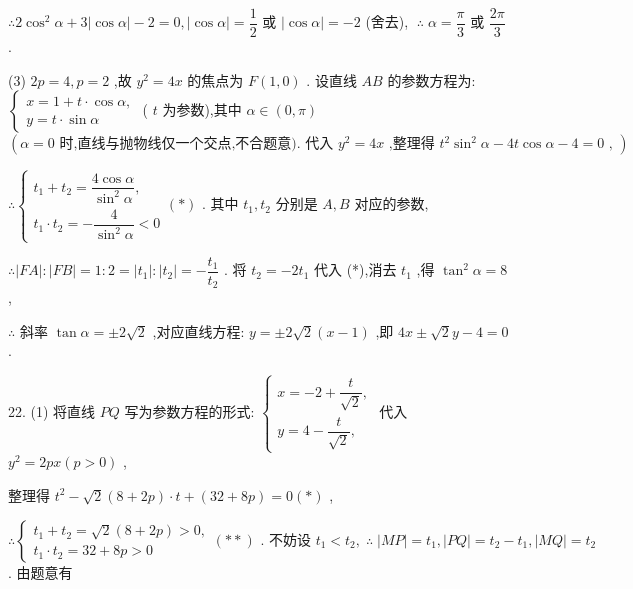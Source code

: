 $\therefore 2{\cos }^{2}\alpha  + 3\left| {\cos \alpha }\right|  - 2 = 0,\left| {\cos \alpha }\right|  = \dfrac{1}{2}$ 或 $\left| {\cos \alpha }\right|  =  - 2$ (舍去), $\;\therefore \;\alpha  = \dfrac{\pi }{3}$ 或 $\dfrac{2\pi }{3}$ .

(3) ${2p} = 4,p = 2$ ,故 ${y}^{2} = {4x}$ 的焦点为 $F\left( {1,0}\right)$ . 设直线 ${AB}$ 的参数方程为: $\left\{  \begin{array}{l} x = 1 + t \cdot  \cos \alpha , \\  y = t \cdot  \sin \alpha  \end{array}\right.$ ( $t$ 为参数),其中 $\alpha  \in  \left( {0,\pi }\right)$  $\left( {\alpha  = 0\text{ 时,直线与抛物线仅一个交点,不合题意). 代入 }{y}^{2} = {4x}\text{ ,整理得 }{t}^{2}{\sin }^{2}\alpha  - {4t}\cos \alpha  - 4 = 0\text{ , }}\right)$

$\therefore \left\{  {\begin{array}{l} {t}_{1} + {t}_{2} = \dfrac{4\cos \alpha }{{\sin }^{2}\alpha }, \\  {t}_{1} \cdot  {t}_{2} =  - \dfrac{4}{{\sin }^{2}\alpha } < 0 \end{array}\left( *\right) }\right.$ . 其中 ${t}_{1},{t}_{2}$ 分别是 $A,B$ 对应的参数,

$\therefore \left| {FA}\right|  : \left| {FB}\right|  = 1 : 2 = \left| {t}_{1}\right|  : \left| {t}_{2}\right|  =  - \dfrac{{t}_{1}}{{t}_{2}}$ . 将 ${t}_{2} =  - 2{t}_{1}$ 代入 (*),消去 ${t}_{1}$ ,得 ${\tan }^{2}\alpha  = 8$ ,

$\therefore$ 斜率 $\tan \alpha  =  \pm  2\sqrt{2}$ ,对应直线方程: $y =  \pm  2\sqrt{2}\left( {x - 1}\right)$ ,即 ${4x} \pm  \sqrt{2}y - 4 = 0$ .

22. (1) 将直线 ${PQ}$ 写为参数方程的形式: $\left\{  \begin{array}{l} x =  - 2 + \dfrac{t}{\sqrt{2}}, \\  y = 4 - \dfrac{t}{\sqrt{2}}, \end{array}\right.$ 代入 ${y}^{2} = {2px}\left( {p > 0}\right)$ ,

整理得 ${t}^{2} - \sqrt{2}\left( {8 + {2p}}\right)  \cdot  t + \left( {{32} + {8p}}\right)  = 0\left( *\right)$ ,

$\therefore \left\{  {\begin{array}{l} {t}_{1} + {t}_{2} = \sqrt{2}\left( {8 + {2p}}\right)  > 0, \\  {t}_{1} \cdot  {t}_{2} = {32} + {8p} > 0 \end{array}\left( {* * }\right) \text{ . 不妨设 }{t}_{1} < {t}_{2},\;\therefore \;\left| {MP}\right|  = {t}_{1},\left| {PQ}\right|  = {t}_{2} - {t}_{1},\left| {MQ}\right|  = {t}_{2}}\right.$ . 由题意有

